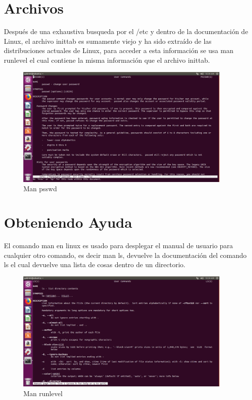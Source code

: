 \documentclass[
  letterpaper, 
  maincolor=black,
  sectioncolor=black!90,
  subsectioncolor=black!70,
  itemtextcolor=black!40,
]{fortysecondscv}
\begin{document}
\section{Archivos}
    Después de una exhaustiva busqueda por el /etc y dentro de la documentación de Linux, el archivo inittab es sumamente viejo y ha sido extraído de las distribuciones actuales de Linux, para acceder a esta información se usa man runlevel el cual contiene la misma información que el archivo inittab.
    \begin{figure}[H]
        \centering
        \includegraphics[trim= 0 175 0 0,clip,width=0.95\textwidth]{img/manpswd.jpg}
        \caption{Man psswd}
        \label{fig:my_label}
    \end{figure}
\section{Obteniendo Ayuda}
    El comando man en linux es usado para desplegar el manual de usuario para cualquier otro comando, es decir man ls, devuelve la documentación del comando ls el cual devuelve una lista de cosas dentro de un directorio.
    \begin{figure}[H]
        \centering
        \includegraphics[trim= 0 175 0 0,clip,width=0.95\textwidth]{img/manRL.jpg}
        \caption{Man runlevel}
        \label{fig:my_label}
    \end{figure}
    
\end{document}

